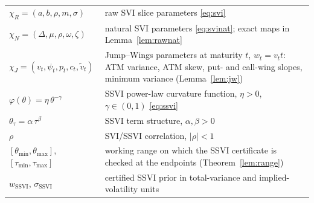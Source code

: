 \documentclass[11pt,a4paper]{report}
\theoremstyle{definition}
\theoremstyle{remark}
\theoremstyle{plain}
\begin{document}
\noindent\begin{tabular}{@{}p{}@{\hspace{6pt}}p{}@{}}
\toprule
$\chi_R=(a,b,\rho,m,\sigma)$ & raw SVI slice parameters \eqref{eq:svi} \\
$\chi_N=(\Delta,\mu,\rho,\omega,\zeta)$ & natural SVI parameters \eqref{eq:svinat}; exact maps in Lemma~\ref{lem:rawnat} \\
$\chi_J=(v_t,\psi_t,p_t,c_t,\tilde v_t)$ & Jump--Wings parameters at maturity $t$, $w_t=v_t t$: ATM variance, ATM skew, put- and call-wing slopes, minimum variance (Lemma~\ref{lem:jw}) \\
$\varphi(\theta)=\eta\,\theta^{-\gamma}$ & SSVI power-law curvature function, $\eta>0$, $\gamma\in(0,1)$ \eqref{eq:ssvi} \\
$\theta_\tau=\alpha\,\tau^{\beta}$ & SSVI term structure, $\alpha,\beta>0$ \\
$\rho$ & SVI/SSVI correlation, $|\rho|<1$ \\
$[\theta_{\min},\theta_{\max}]$, $[\tau_{\min},\tau_{\max}]$ & working range on which the SSVI certificate is checked at the endpoints (Theorem~\ref{lem:range}) \\
$w_{\mathrm{SSVI}}$, $\sigma_{\mathrm{SSVI}}$ & certified SSVI prior in total-variance and implied-volatility units \\
\bottomrule
\end{tabular}

\newpage
\end{document}
